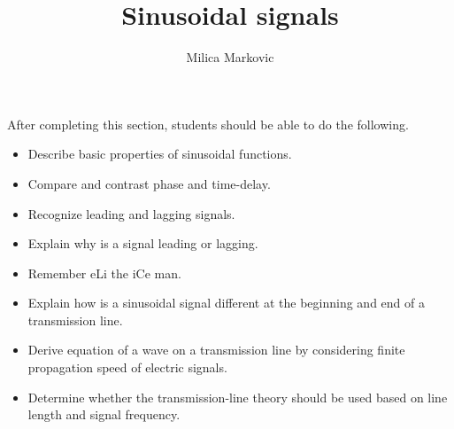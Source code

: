 \documentclass{ximera}
\title{Sinusoidal signals}
\author{Milica Markovic}
\begin{document}
\begin{abstract}
\end{abstract}

\maketitle


\begin{sectionOutcomes}
After completing this section, students should be able to do the following.
\begin{itemize}
\item Describe basic properties of sinusoidal functions.
\item Compare and contrast phase and time-delay.
\item Recognize leading and lagging signals. 
\item Explain why is a signal leading or lagging.
\item Remember eLi the iCe man.
\item Explain how is a sinusoidal signal different at the beginning and end of a transmission line.
\item Derive equation of a wave on a transmission line by considering finite propagation speed of electric signals.
\item Determine whether the transmission-line theory should be used based on line length and signal frequency.
\end{itemize}
\end{sectionOutcomes}
\end{document}
